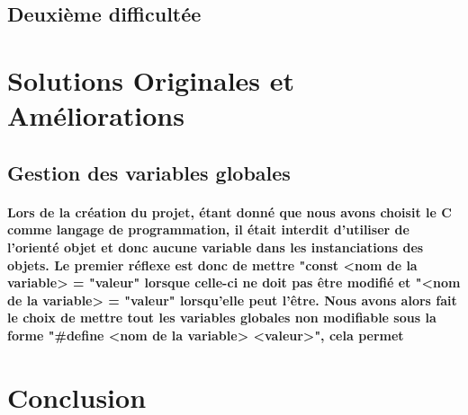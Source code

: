 \documentclass[utf8]{article}
\begin{document}
\subsection{Deuxième difficultée}
\paragraph{}

\section{Solutions Originales et Améliorations}
\subsection{Gestion des variables globales}
\paragraph{Lors de la création du projet, étant donné que nous avons choisit le C comme langage de programmation, il était interdit 
d'utiliser de l'orienté objet et donc aucune variable dans les instanciations des objets. Le premier réflexe est donc de mettre
"const <nom de la variable> = "valeur" lorsque celle-ci ne doit pas être modifié et "<nom de la variable> = "valeur" lorsqu'elle 
peut l'être. Nous avons alors fait le choix de mettre tout les variables globales non modifiable sous la forme 
"\#define <nom de la variable> <valeur>", cela permet }

\section{Conclusion}
\paragraph{}
\end{document}
